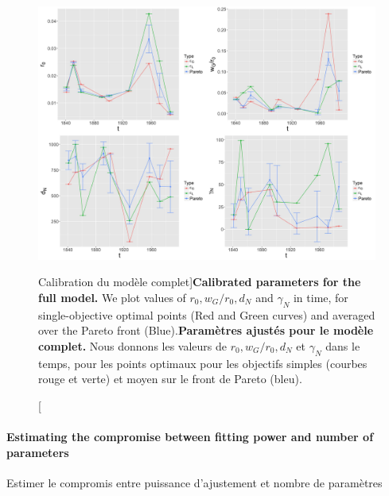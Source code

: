 \begin{figure}
\includegraphics[width=\linewidth]{Figures/Final/4-3-2-fig-interactiongibrat-feedback}
\caption[Full model calibration][Calibration du modèle complet]{\textbf{Calibrated parameters for the full model.} We plot values of $r_0, w_G/r_0, d_N$ and $\gamma_N$ in time, for single-objective optimal points (Red and Green curves) and averaged over the Pareto front (Blue).\label{fig:interactiongibrat:feedback}}{\textbf{Paramètres ajustés pour le modèle complet.} Nous donnons les valeurs de $r_0, w_G/r_0, d_N$ et $\gamma_N$ dans le temps, pour les points optimaux pour les objectifs simples (courbes rouge et verte) et moyen sur le front de Pareto (bleu).\label{fig:interactiongibrat:feedback}}
\end{figure}







\paragraph{Estimating the compromise between fitting power and number of parameters}{Estimer le compromis entre puissance d'ajustement et nombre de paramètres}


